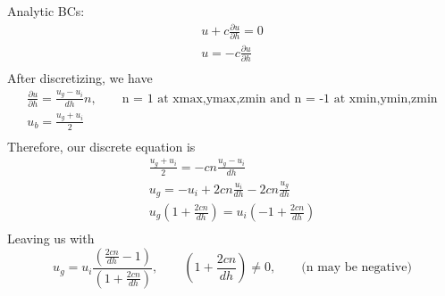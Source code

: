 \documentclass[11pt]{article}
\newcommand{\PD}{\partial}
\begin{document}
Analytic BCs:
\begin{equation}\begin{aligned}
	u + c \frac{\PD u}{\PD h} = 0 \\
	u =-c \frac{\PD u}{\PD h} \\
\end{aligned}\end{equation}
After discretizing, we have
\begin{equation}\begin{aligned}
	\frac{\PD u}{\PD h} = \frac{u_g - u_i}{dh} n, \qquad \text{n = 1 at xmax,ymax,zmin and n = -1 at xmin,ymin,zmin} \\
	u_b = \frac{u_g+u_i}{2} \\
\end{aligned}\end{equation}
Therefore, our discrete equation is
\begin{equation}\begin{aligned}
	\frac{u_g+u_i}{2} = -cn \frac{u_g - u_i}{dh} \\
	u_g = -u_i + 2cn \frac{u_i}{dh} - 2cn \frac{u_g}{dh} \\
	u_g \left( 1 + \frac{2 cn}{dh} \right) = u_i \left( -1 + \frac{2cn}{dh} \right) \\
\end{aligned}\end{equation}
Leaving us with
\begin{equation}
	\boxed{
	u_g = u_i \frac{\left(\frac{2cn}{dh} - 1 \right)}{\left(1 + \frac{2cn}{dh} \right)},
	\qquad \left(1 + \frac{2cn}{dh} \right) \ne 0, \qquad \text{(n may be negative)}
	}
\end{equation}
\end{document}

